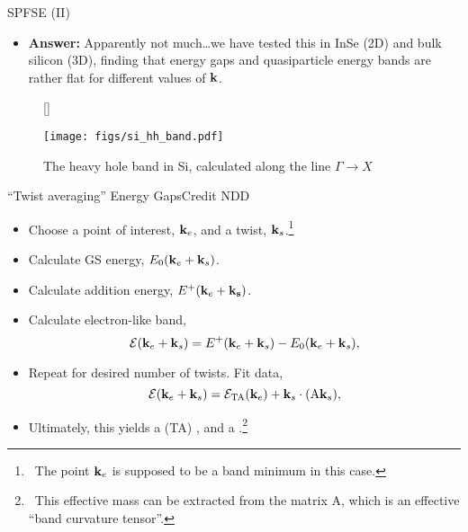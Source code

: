 \documentclass[12pt, pdf, hyperref={draft}, usenames, dvipsnames,
aspectratio=169]{beamer}
\newcommand{\green}[1]{{\bf\color{ForestGreen}{#1}}}
\begin{document}
\begin{frame}{SPFSE (II)}
\begin{itemize}

  \item {\bf Answer:} Apparently not much\ldots we have tested this in InSe
  (2D) and bulk silicon (3D), finding that energy gaps and quasiparticle energy
  bands are rather flat for different values of ${\bf k}$.

\end{itemize}


\begin{figure}[H]
  [\FBwidth]
  {\caption{The heavy hole band in Si, calculated along the line $\Gamma
  \rightarrow X$}\label{fig:si_hh_band}}
  {\texttt{[image: figs/si\_hh\_band.pdf]}}
\end{figure}
\end{frame}

\begin{frame}{``Twist averaging'' Energy Gaps}{Credit NDD}
\begin{itemize}

  \item Choose a point of interest, ${\bf k}_e$, and a twist, ${\bf
  k}_s$.\footnote{\ The point ${\bf k}_e$ is supposed to be a band minimum in
  this case.}

  \item Calculate GS energy, ${E_{0} ({\bf k}_e+{\bf k}_s)}$.

  \item Calculate addition energy, $E^{+} ({\bf k}_e+{\bf{k}_s})$.

  \item Calculate electron-like band,
  \begin{equation}
    \mathcal{E}({\bf k}_e + {\bf k}_s) = E^{+}({\bf k}_e + {\bf k}_s) -
    E_{0}({\bf k}_e + {\bf k}_s) \nonumber,
  \end{equation}
  \item Repeat for desired number of twists. Fit data,
  \begin{equation}
    \mathcal{E}({\bf k}_e + {\bf k}_s) = \mathcal{E}_{\text{TA}}({\bf k}_e) +
    {\bf k}_s \cdot (\mathrm{A}{\bf k}_s) \nonumber,
  \end{equation}
  \item Ultimately, this yields a (TA) \green{QMC energy band value}, and a
  \green{QMC effective mass}.\footnote{\ This effective mass can
  be extracted from the matrix $\mathrm{A}$, which is an effective ``band
  curvature tensor''.}

\end{itemize}
\end{frame}
\end{document}
